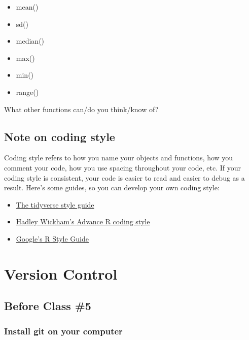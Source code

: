 \documentclass[
]{book}
\begin{document}
\begin{itemize}
\item
  mean()
\item
  sd()
\item
  median()
\item
  max()
\item
  min()
\item
  range()
\end{itemize}

What other functions can/do you think/know of?

\hypertarget{note-on-coding-style}{%
\section{Note on coding style}\label{note-on-coding-style}}

Coding style refers to how you name your objects and functions, how you comment your code, how you use spacing throughout your code, etc. If your coding style is consistent, your code is easier to read and easier to debug as a result. Here's some guides, so you can develop your own coding style:

\begin{itemize}
\item
  \href{https://style.tidyverse.org}{The tidyverse style guide}
\item
  \href{http://adv-r.had.co.nz/Style.html}{Hadley Wickham's Advance R coding style}
\item
  \href{https://google.github.io/styleguide/Rguide.html}{Google's R Style Guide}
\end{itemize}

\hypertarget{version-control}{%
\chapter{Version Control}\label{version-control}}

\hypertarget{before-class-5}{%
\section{Before Class \#5}\label{before-class-5}}

\hypertarget{install-git-on-your-computer}{%
\subsection{Install git on your computer}\label{install-git-on-your-computer}}
\end{document}
